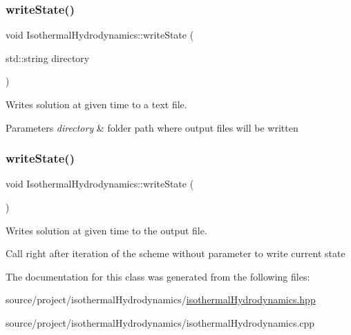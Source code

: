 \subsubsection{\texorpdfstring{write\+State()}{writeState()}\hspace{0.1cm}{\footnotesize\ttfamily [1/2]}}
{\footnotesize\ttfamily void Isothermal\+Hydrodynamics\+::write\+State (\begin{DoxyParamCaption}\item[{std\+::string}]{directory }\end{DoxyParamCaption})}



Writes solution at given time to a text file. 


\begin{DoxyParams}{Parameters}
{\em directory} & folder path where output files will be written \\
\hline
\end{DoxyParams}
\mbox{\label{classIsothermalHydrodynamics_aee2e4f4a44742c9a93062bf64b4a8afa}} 
\subsubsection{\texorpdfstring{write\+State()}{writeState()}\hspace{0.1cm}{\footnotesize\ttfamily [2/2]}}
{\footnotesize\ttfamily void Isothermal\+Hydrodynamics\+::write\+State (\begin{DoxyParamCaption}{ }\end{DoxyParamCaption})}



Writes solution at given time to the output file. 

Call right after iteration of the scheme without parameter to write current state 

The documentation for this class was generated from the following files\+:\begin{DoxyCompactItemize}
\item 
source/project/isothermal\+Hydrodynamics/\hyperlink{isothermalHydrodynamics_8hpp}{isothermal\+Hydrodynamics.\+hpp}\item 
source/project/isothermal\+Hydrodynamics/isothermal\+Hydrodynamics.\+cpp\end{DoxyCompactItemize}
